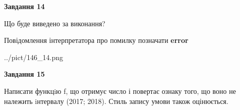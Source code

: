 \documentclass[11pt, ukrainian]{article}
\begin{document}
{\begin {large}
{\begin {center}\textbf{Завдання 14}\end {center}}\par
Що буде виведено за виконання? \par
Повідомлення інтерпретатора про помилку позначати \textbf{error}

\begin{center}
	{../pict/146_14.png}
\end{center}
\newpage

{\begin {center}\textbf{Завдання 15}\end {center}}\par

Написати функцiю f, що отримує число і повертає ознаку того, що воно не належить iнтервалу (2017; 2018). Стиль запису умови також оцінюється.\par
\newpage

\end {large}}
\end{document}
